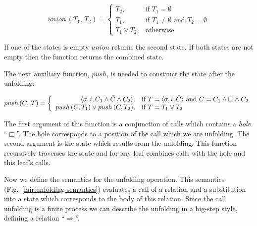 \[
union\,(T_1,\, T_2) =
\left\{
\begin{array}{rl}
T_2, & \mbox{if } T_1 = \emptyset \\
T_1, & \mbox{if } T_1 \not= \emptyset \mbox{ and } T_2 = \emptyset \\
T_1 \lor T_2, & \mbox{otherwise}
\end{array}
\right.
\]


If one of the states is empty $union$ returns the second state. If both states are not empty then the function returns the combined state.

The next auxiliary function, $push$, is needed to construct the state after the unfolding:

\[
push\,(C,\, T) =
\left\{
\begin{array}{rl}
\langle \sigma, i, C_1 \land \bar{C} \land C_2 \rangle, & \mbox{if } T = \langle \sigma, i, \bar{C} \rangle \mbox{ and } C = C_1 \land \Box \land C_2 \\
push\,(C, T_1) \lor push\,(C, T_2), & \mbox{if } T = T_1 \lor T_2
\end{array}
\right.
\]


The first argument of this function is a conjunction of calls which contains a \emph{hole} ``$\Box$''. The hole corresponds to a position of the call which we are unfolding. 
The second argument is the state which results from the unfolding. This function recursively traverses the state and for any leaf combines calls with the hole and this leaf's calls.

Now we define the semantics for the unfolding operation. This semantics (Fig.~\ref{fair:unfolding-semantics}) evaluates a call of a relation and a substitution into a state which
corresponds to the body of this relation. Since the call unfolding is a finite process we can describe the unfolding in a big-step style, defining a relation ``$\Rightarrow$''.

